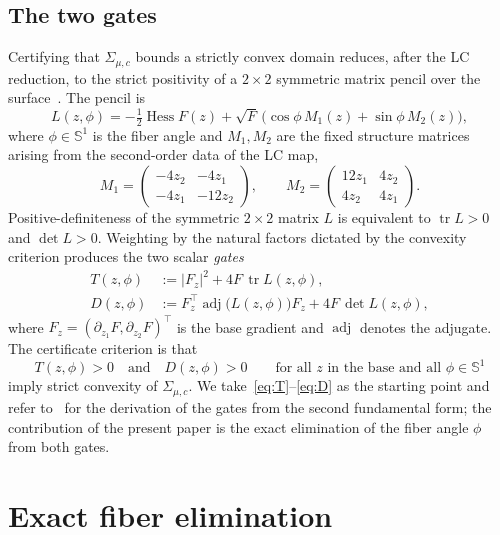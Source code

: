 \documentclass[11pt,reqno]{amsart}
\theoremstyle{plain}
\theoremstyle{definition}
\DeclareMathOperator{\tr}{tr}
\DeclareMathOperator{\adj}{adj}
\DeclareMathOperator{\Hess}{Hess}
\newcommand{\Sph}{\mathbb{S}}
\newcommand{\Fz}{F_{z}}
\begin{document}
\subsection{The two gates}\label{sec:gates}
Certifying that $\Sigma_{\mu,c}$ bounds a strictly convex domain reduces, after the LC reduction, to the strict positivity of a $2\times 2$ symmetric matrix pencil over the surface~\cite{GrisaCertificate}. The pencil is
\begin{equation}\label{eq:L}
L(z,\phi)=-\tfrac12\Hess F(z)+\sqrt{F}\,\bigl(\cos\phi\,M_1(z)+\sin\phi\,M_2(z)\bigr),
\end{equation}
where $\phi\in\Sph^1$ is the fiber angle and $M_1,M_2$ are the fixed structure matrices arising from the second-order data of the LC map,
\begin{equation}\label{eq:M}
M_1=\begin{pmatrix}-4z_2&-4z_1\\-4z_1&-12z_2\end{pmatrix},
\qquad
M_2=\begin{pmatrix}12z_1&4z_2\\4z_2&4z_1\end{pmatrix}.
\end{equation}
Positive-definiteness of the symmetric $2\times2$ matrix $L$ is equivalent to $\tr L>0$ and $\det L>0$. Weighting by the natural factors dictated by the convexity criterion produces the two scalar \emph{gates}
\begin{align}
T(z,\phi)&:=|\Fz|^2+4F\,\tr L(z,\phi),\label{eq:T}\\
D(z,\phi)&:=\Fz^{\!\top}\adj\!\bigl(L(z,\phi)\bigr)\Fz+4F\,\det L(z,\phi),\label{eq:D}
\end{align}
where $\Fz=(\partial_{z_1}F,\partial_{z_2}F)^\top$ is the base gradient and $\adj$ denotes the adjugate. The certificate criterion is that
\[
T(z,\phi)>0\quad\text{and}\quad D(z,\phi)>0\qquad\text{for all }z\text{ in the base and all }\phi\in\Sph^1
\]
imply strict convexity of $\Sigma_{\mu,c}$. We take~\eqref{eq:T}--\eqref{eq:D} as the starting point and refer to~\cite{GrisaCertificate} for the derivation of the gates from the second fundamental form; the contribution of the present paper is the exact elimination of the fiber angle $\phi$ from both gates.

\section{Exact fiber elimination}\label{sec:elimination}
\end{document}
